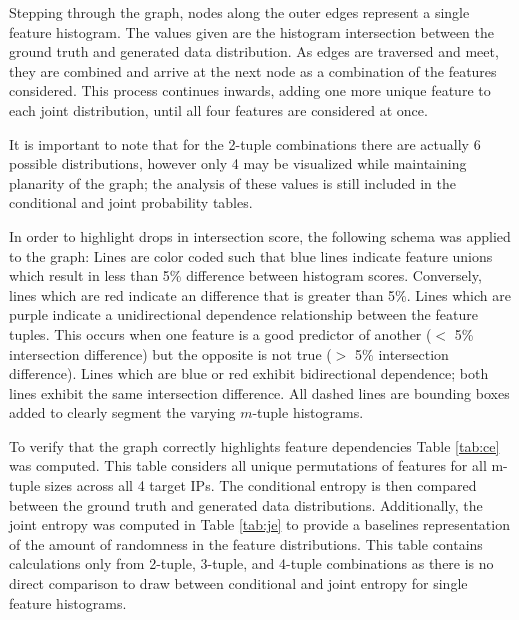 Stepping through the graph, nodes along the outer edges represent a single feature histogram. The values given are the histogram intersection between the ground truth and generated data distribution. As edges are traversed and meet, they are combined and arrive at the next node as a combination of the features considered. This process continues inwards, adding one more unique feature to each joint distribution, until all four features are considered at once.

It is important to note that for the 2-tuple combinations there are actually 6 possible distributions, however only 4 may be visualized while maintaining planarity of the graph; the analysis of these values is still included in the conditional and joint probability tables.

In order to highlight drops in intersection score, the following schema was applied to the graph: Lines are color coded such that blue lines indicate feature unions which result in less than 5\% difference between histogram scores. Conversely, lines which are red indicate an difference that is greater than 5\%. Lines which are purple indicate a unidirectional dependence relationship between the feature tuples. This occurs when one feature is a good predictor of another ($<$ 5\% intersection difference) but the opposite is not true ($>$ 5\% intersection difference). Lines which are blue or red exhibit bidirectional dependence; both lines exhibit the same intersection difference. All dashed lines are bounding boxes added to clearly segment the varying $m$-tuple histograms.

To verify that the graph correctly highlights feature dependencies Table \ref{tab:ce} was computed. This table considers all unique permutations of features for all m-tuple sizes across all 4 target IPs. The conditional entropy is then compared between the ground truth and generated data distributions. Additionally, the joint entropy was computed in Table \ref{tab:je} to provide a baselines representation of the amount of randomness in the feature distributions. This table contains calculations only from 2-tuple, 3-tuple, and 4-tuple combinations as there is no direct comparison to draw between conditional and joint entropy for single feature histograms.


